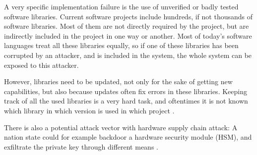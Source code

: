 A very specific implementation failure is the use of unverified or badly tested
software libraries.
Current software projects include hundreds, if not thousands of software libraries.
Most of them are not directly required by the project, but are indirectly included
in the project in one way or another.
Most of today's software languages treat all these libraries equally, so if one of
these libraries has been corrupted by an attacker, and is included in the system,
the whole system can be exposed to this attacker.

However, libraries need to be updated, not only for the sake of getting new capabilities,
but also because updates often fix errors in these libraries.
Keeping track of all the used libraries is a very hard task, and oftentimes it is not
known which library in which version is used in which project \cite{Log4Shell21}.

There is also a potential attack vector with hardware supply chain attack:
A nation state could for example backdoor a hardware security module (HSM), 
and exfiltrate the private key through different means \cite{SchneierBackdoor25}.
